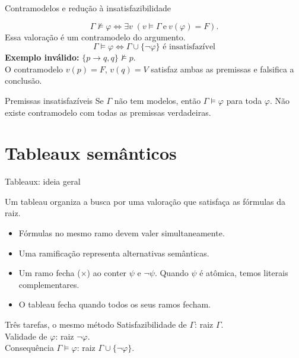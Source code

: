 \documentclass[10pt,aspectratio=169]{beamer}
\newcommand{\dest}[1]{\alert{#1}}
\begin{document}
\begin{frame}{Contramodelos e redução à insatisfazibilidade}

\[\Gamma\not\models\varphi\iff
\exists v\;(v\models\Gamma\ \text{e}\ v(\varphi)=F).\]
Essa valoração é um \dest{contramodelo do argumento}.
\[\boxed{\Gamma\models\varphi\iff
\Gamma\cup\{\neg\varphi\}\text{ é insatisfazível}}\]
\textbf{Exemplo inválido:} $\{p\to q,q\}\not\models p$.\\
O contramodelo $v(p)=F$, $v(q)=V$ satisfaz ambas as premissas e falsifica a conclusão.
\begin{block}{Premissas insatisfazíveis}
Se $\Gamma$ não tem modelos, então $\Gamma\models\varphi$ para toda $\varphi$.
Não existe contramodelo com todas as premissas verdadeiras.
\end{block}
\end{frame}

\section{Tableaux semânticos}

\begin{frame}{Tableaux: ideia geral}

Um tableau organiza a busca por uma valoração que satisfaça as fórmulas da raiz.
\begin{itemize}
\item Fórmulas no \dest{mesmo ramo} devem valer simultaneamente.
\item Uma \dest{ramificação} representa alternativas semânticas.
\item Um ramo fecha ($\times$) ao conter $\psi$ e $\neg\psi$. Quando $\psi$ é atômica, temos literais complementares.
\item O tableau fecha quando \dest{todos} os seus ramos fecham.
\end{itemize}
\begin{block}{Três tarefas, o mesmo método}
Satisfazibilidade de $\Gamma$: raiz $\Gamma$.\\
Validade de $\varphi$: raiz $\neg\varphi$.\\
Consequência $\Gamma\models\varphi$: raiz $\Gamma\cup\{\neg\varphi\}$.
\end{block}
\end{frame}
\end{document}
